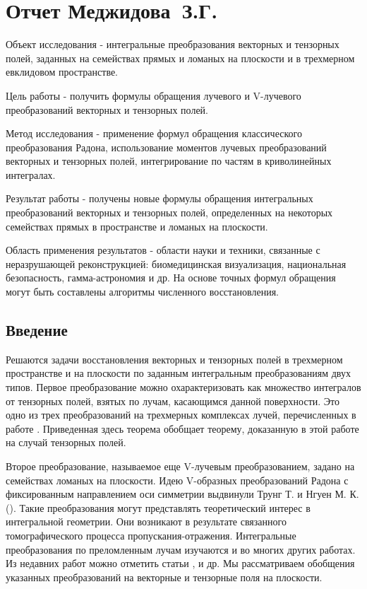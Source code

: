 % 
\chapter{Отчет Меджидова~З.Г.}

Объект исследования - интегральные преобразования векторных и тензорных полей, заданных на семействах прямых и ломаных на плоскости и в трехмерном евклидовом пространстве. 

Цель работы  - получить формулы обращения лучевого и V-лучевого преобразований  векторных и тензорных полей.

Метод исследования - применение формул обращения классического преобразования Радона, использование моментов лучевых преобразований векторных и тензорных полей, интегрирование по частям в криволинейных интегралах.

Результат работы - получены новые формулы обращения интегральных преобразований векторных и тензорных полей, определенных на некоторых семействах прямых в пространстве и ломаных на плоскости. 

Область применения результатов - области науки и техники, связанные с неразрушающей реконструкцией: биомедицинская визуализация, национальная безопасность, гамма-астрономия и др. На основе точных формул обращения могут быть составлены алгоритмы численного восстановления.


\section{Введение}
Решаются задачи восстановления векторных и тензорных полей в трехмерном пространстве и на плоскости по заданным интегральным преобразованиям двух типов. Первое преобразование можно охарактеризовать как множество интегралов от тензорных полей, взятых по лучам, касающимся данной поверхности. Это одно из трех преобразований на трехмерных комплексах лучей, перечисленных в работе \cite{Medzhidov}. Приведенная здесь теорема обобщает теорему, доказанную в этой работе на случай тензорных полей.

Второе преобразование, называемое еще V-лучевым преобразованием, задано на семействах ломаных на плоскости. Идею V-образных преобразований Радона с фиксированным направлением оси симметрии выдвинули Трунг Т. и Нгуен М. К. (\cite{Truong}). Такие преобразования могут представлять теоретический интерес в интегральной геометрии. Они возникают в результате связанного томографического процесса пропускания-отражения. Интегральные преобразования по преломленным лучам изучаются и во многих других работах. Из недавних работ можно отметить статьи \cite{Sharafutdinov}, \cite{Ambartsoumian}  и др.
Мы рассматриваем обобщения указанных преобразований на векторные и тензорные поля на плоскости.
